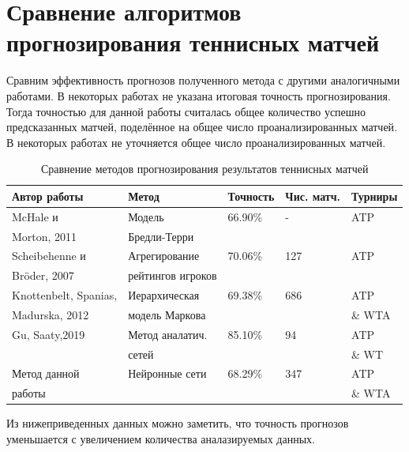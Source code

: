 \section{Сравнение алгоритмов прогнозирования теннисных матчей}
Сравним эффективность прогнозов полученного метода с другими аналогичными работами.
В некоторых работах не указана итоговая точность прогнозирования. Тогда точностью для данной работы считалась общее количество успешно предсказанных матчей, поделённое на общее число проанализированных матчей\cite{Book40}. В некоторых работах не уточняется общее число проанализированных матчей.
\begin{table}[!h]
	
	\caption{\label{tab:issled1}Сравнение методов прогнозирования результатов теннисных матчей}
	
	\begin{center}
		
		\begin{tabular}{|l|l|l|l|l|}
			
			\hline
			
			Автор работы& Метод & Точность & Чис. матч.& Турниры  \\
			
			\hline 
			
			McHale и & Модель& 66.90\% & - & ATP  \\
			Morton, 2011  \cite{Book18} & Бредли-Терри& & &  \\
			\hline
			Scheibehenne и  & Агрегирование  & 70.06\% & 127 & ATP  \\
			Bröder,
			2007\cite{Book40} &рейтингов игроков&&& \\
			\hline
			Knottenbelt, Spanias,& Иерархическая & 69.38\% & 686& ATP  	\\		Madurska, 2012\cite{Book41} & модель Маркова& && \& WTA \\
			\hline
			Gu, Saaty,2019\cite{Book42} &Метод аналатич.& 85.10\%&94&ATP \\
			&сетей&&&\& WT\\
			\hline
			Метод данной &Нейронные сети& 68.29\%&347&ATP \\
			работы &&&&\& WTA\\
			\hline
		\end{tabular}
		
	\end{center}
	
\end{table}
 Из нижеприведенных данных можно заметить, что точность прогнозов уменьшается с увеличением количества аналазируемых данных.


